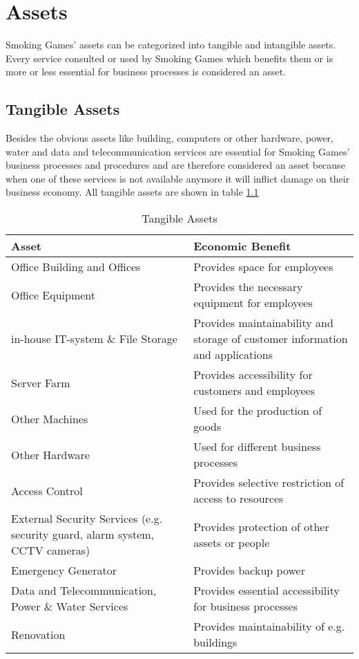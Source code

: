 \chapter{Assets}
Smoking Games' assets can be categorized into tangible and intangible assets. Every service consulted or used by Smoking Games which benefits them or is more or less essential for business processes is considered an asset.
\section{Tangible Assets}
Besides the obvious assets like building, computers or other hardware, power, water and data and telecommunication services are essential for Smoking Games' business processes and procedures and are therefore considered an asset because when one of these services is not available anymore it will inflict damage on their business economy. All tangible assets are shown in table \ref{tab:TangibleAssets}
\begin{table}[h]
	\centering
	\begin{tabular}{l | l}
		\textbf{Asset} & \textbf{Economic Benefit}\\\hline\hline
		\parbox[t]{6cm}{Office Building and Offices} & \parbox[t]{6cm}{Provides space for employees}\\\hline
		\parbox[t]{6cm}{Office Equipment} & \parbox[t]{6cm}{Provides the necessary equipment for employees}\\\hline
		\parbox[t]{6cm}{in-house IT-system \& File Storage} & \parbox[t]{6cm}{Provides maintainability and storage of customer information and applications}\\\hline
		\parbox[t]{6cm}{Server Farm} & \parbox[t]{6cm}{Provides accessibility for customers and employees}\\\hline
		\parbox[t]{6cm}{Other Machines} & \parbox[t]{6cm}{Used for the production of goods}\\\hline
		\parbox[t]{6cm}{Other Hardware} & \parbox[t]{6cm}{Used for different business processes}\\\hline
		\parbox[t]{6cm}{Access Control} & \parbox[t]{6cm}{Provides selective restriction of access to resources}\\\hline
		\parbox[t]{6cm}{External Security Services (e.g. security guard, alarm system, CCTV cameras)} & \parbox[t]{6cm}{Provides protection of other assets or people}\\\hline
		\parbox[t]{6cm}{Emergency Generator} & \parbox[t]{6cm}{Provides backup power}\\\hline
		\parbox[t]{6cm}{Data and Telecommunication, Power \& Water Services} & \parbox[t]{6cm}{Provides essential accessibility for business processes}\\\hline
		\parbox[t]{6cm}{Renovation} & \parbox[t]{6cm}{Provides maintainability of e.g. buildings}\\
	\end{tabular}
	\caption{Tangible Assets}\label{tab:TangibleAssets}
\end{table}
